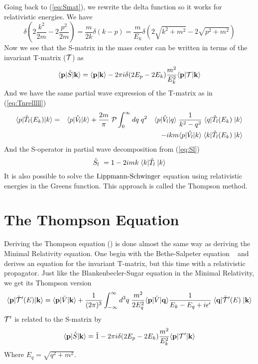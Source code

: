 Going back to (\ref{eq:Smat}), we rewrite the delta function so it works for relativistic energies. We have
\begin{equation}\label{eq:DEklasErel}
\delta(2\frac{k^2}{2m}-2\frac{p^2}{2m}) =\frac{m}{2k}\delta(k-p)=\frac{m}{E_k}\delta(2\sqrt{k^2+m^2}-2\sqrt{p^2+m^2})
\end{equation}
%
Now we see that the S-matrix in the mass center can be written in terms of the invariant T-matrix ($\cal{T}$) as
\begin{equation}\label{eq:Smatrela}
\braketm{{\bf p}} {\op{S}}{{\bf k}}=\braket{{\bf p}}{{\bf k}}-2\pi i \delta (2E_p-2E_k)\frac{m^2}{E^2_k}\braketm{{\bf p}} {{\cal{T}}}{{\bf k}}
\end{equation}
%
And we have the same partial wave expression of the T-matrix as in (\ref{eq:Tnrelllll}) 
\begin{eqnarray}\label{eq:Trelllll}
\braketm{{ p}} {\op{T}_l(E_{ k})}{{ k}}&=&\braketm{{ p}}{\op{V}_l}{{ k}}
+ \frac{2m}{\pi}\;{\cal P}\int^{\infty}_{0}d { q}\; q^2 \quad\bra{{ p}}\op{V}_l\ket{{ q}}
\;\inv{{ k^2}-{ q^2}}   \;\bra{{ q}} \op{T}_l(E_{ k})\;\ket{{ k}}\nonumber\\
&&
-i { k}m \bra{{ p}}\op{V_l}\ket{{ k}}
\;\bra{{ k}}\op{T}_l(E_{ k})\;\ket{{ k}}
\end{eqnarray}
%
And the S-operator in partial wave decomposition from (\ref{eq:Sl})
\begin{equation}\label{eq:Sl2}
\op{S}_{l}\ =1-2imk\;\bra{k}\op{T}_{l}\;\ket{{ k}}
\end{equation}
%
It is also possible to solve the $\text{Lippmann-Schwinger}$ equation using relativistic energies in the Greens function. This approach is called 
the Thompson method.





\section{The Thompson Equation} 

Deriving the Thompson equation (\cite{Thompson}) is done almost the same way as deriving the Minimal Relativity equation.
One begin with the Bethe-Salpeter equation ~\cite{Bhete-Salpeter} and derives an equation for the invariant T-matrix, but this time with a
relativistic propagator. Just like the Blankenbecler-Sugar equation in the Minimal Relativity, we get its Thompson version
\begin{equation}\label{eq:Thompsens_Blankenbecler-Sugar}
\braketm{{\bf p}} {\op{{\cal T}}'(E)}{{\bf k}} =\braketm{{\bf p}}{\bar{V}}{{\bf k}}
+ \inv{(2\pi)^3}\int^{\infty}_{-\infty}d^3 { q}\;\frac{m^2}{2E^2_q}\bra{{\bf p}}\bar{V}\ket{{\bf q}}
\inv{E_{ k}-E_{ q}+i\epsilon '}   \;\bra{{\bf q}} \op{{\cal T}}'(E)\;\ket{{\bf k}}
\end{equation}
$\cal{T}'$ is related to the S-matrix by
\begin{equation}\label{eq:SmatrelaT}
\braketm{{\bf p}} {\op{S}}{{\bf k}}=\op{1}-2\pi i \delta (2E_p-2E_k)\frac{m^2}{E^2_k}\braketm{{\bf p}} {{\cal{T}}'}{{\bf k}}
\end{equation}
Where $E_q=\sqrt{q^2+m^2}$.

